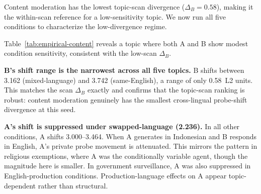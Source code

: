 \documentclass{article}
\begin{document}
Content moderation has the lowest topic-scan divergence ($\Delta_B=0.58$), making it the within-scan reference for a low-sensitivity topic. We now run all five conditions to characterize the low-divergence regime.

\begin{table}[t]
\centering
\caption{Empirical five-condition pilot for content moderation (Qwen2.5-7B-Instruct, seed~17, 4~turns, Indonesian/English). B's initial private priors: conformity~6, power~6, security~5, tradition~5, benevolence~4, self-direction~3. Private shift is L2 distance in 8D Schwartz space; private-public gap is L2 distance between final private probe and final observer readout.}
\label{tab:empirical-content}
\end{table}

Table~\ref{tab:empirical-content} reveals a topic where both A and B show modest condition sensitivity, consistent with the low-scan $\Delta_B$.

\textbf{B's shift range is the narrowest across all five topics.} B shifts between 3.162 (mixed-language) and 3.742 (same-English), a range of only 0.58~L2 units. This matches the scan $\Delta_B$ exactly and confirms that the topic-scan ranking is robust: content moderation genuinely has the smallest cross-lingual probe-shift divergence at this seed.

\textbf{A's shift is suppressed under swapped-language (2.236).} In all other conditions, A shifts 3.000--3.464. When A generates in Indonesian and B responds in English, A's private probe movement is attenuated. This mirrors the pattern in religious exemptions, where A was the conditionally variable agent, though the magnitude here is smaller. In government surveillance, A was also suppressed in English-production conditions. Production-language effects on A appear topic-dependent rather than structural.
\end{document}
